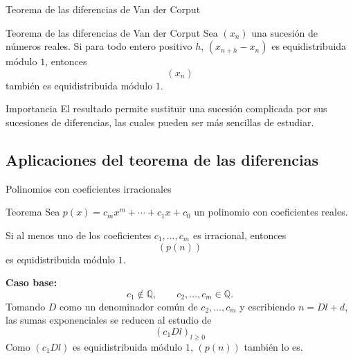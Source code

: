 \begin{frame}{Teorema de las diferencias de Van der Corput}
\begin{block}{Teorema de las diferencias de Van der Corput}
Sea $(x_n)$ una sucesión de números reales.
Si para todo entero positivo $h$, $(x_{n+h}-x_n)$ es equidistribuida 
módulo $1$, entonces
\[
(x_n)
\]
también es equidistribuida módulo $1$.
\end{block}

\vspace{0.2cm}
\pause

\begin{exampleblock}{Importancia}
El resultado permite sustituir una sucesión complicada
por sus sucesiones de diferencias, las cuales pueden ser más sencillas de estudiar.
\end{exampleblock}

\end{frame}


\subsection{Aplicaciones del teorema de las diferencias}
\begin{frame}{Polinomios con coeficientes irracionales}

\begin{block}{Teorema}
Sea $p(x)=c_mx^m+\cdots+c_1x+c_0$ un polinomio con coeficientes reales.

Si al menos uno de los coeficientes
$c_1,\ldots,c_m$ es irracional, entonces
\[
(p(n))
\]
es equidistribuida módulo $1$.
\end{block}

\pause

\begin{demostracion}
\textbf{Caso base:}
\[
c_1\notin\mathbb Q,
\qquad
c_2,\ldots,c_m\in\mathbb Q.
\]
Tomando $D$ como un denominador común de $c_2, \ldots, c_m$ y escribiendo $n = Dl + d$, 
las sumas exponenciales se reducen al estudio de 
\[
(c_1Dl)_{l\geq0}
\]
Como $(c_1Dl)$ es equidistribuida módulo $1$, $(p(n))$ también lo es.

\end{demostracion}
\end{frame}

